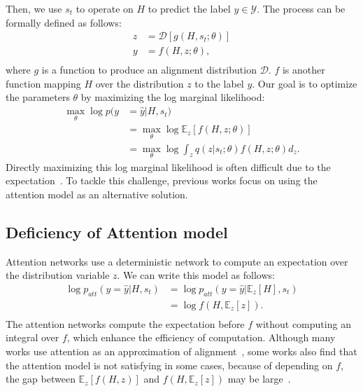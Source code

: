 \documentclass[letterpaper]{article} \usepackage{aaai19}  \usepackage{times}  \usepackage{helvet}  \usepackage{courier}  \usepackage{url}  \usepackage{graphicx}  \usepackage{amsmath}
\begin{document}
Then, we use $s_t$ to operate on $H$ to predict the label $y \in \mathcal{Y}$. The process can be formally defined as follows:
\begin{equation}
\begin{aligned}
z &= \mathcal{D}[g(H, s_t; \theta)] \\
y &= f(H, z; \theta), \\
\end{aligned}
\end{equation}
where $g$ is a function to produce an alignment distribution $\mathcal{D}$. $f$ is another function mapping $H$ over the distribution $z$ to the label $y$. Our goal is to optimize the parameters $\theta$ by maximizing the log marginal likelihood:
\begin{equation}
\begin{aligned}
\max\limits_{\theta}\log p(y&=\hat{y}|H, s_t) \\
&= \max\limits_{\theta} \log \mathbb{E}_{z}[f(H,z;\theta)] \\
&= \max\limits_{\theta} \log \int_{z} q(z|s_t;\theta)f(H,z;\theta)d_z.
\end{aligned}
\end{equation}
Directly maximizing this log marginal likelihood is often difficult due to the expectation~\cite{deng2018latent}. To tackle this challenge, previous works focus on using the attention model as an alternative solution.

\subsection{Deficiency of Attention model}
Attention networks use a deterministic network to compute an expectation over the distribution variable $z$. We can write this model as follows:
\begin{equation}
\begin{aligned}
\log p_{att}(y=\hat{y}|H,s_t)&=\log p_{att}(y=\hat{y}|\mathbb{E}_z[H],s_t)\\
&=\log f(H, \mathbb{E}_z[z]). \\
\end{aligned}
\end{equation}
The attention networks compute the expectation before $f$ without computing an integral over $f$, which enhance the efficiency of computation. Although many works use attention as an approximation of alignment~\cite{cohn2016incorporating,tu2016modeling}, some works also find that the attention model is not satisfying in some cases\cite{xu2015show}, because of depending on $f$, the gap between $\mathbb{E}_z[f(H,z)]$ and $f(H,\mathbb{E}_z[z])$ may be large~\cite{deng2018latent}.
\end{document}
